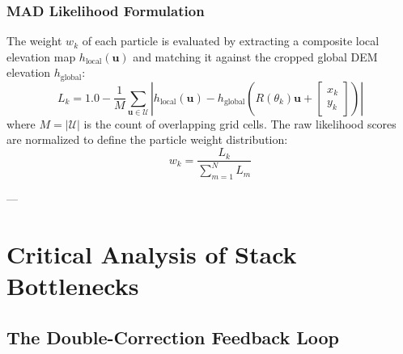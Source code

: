 \documentclass[10pt,journal,compsoc]{IEEEtran}
\begin{document}
\subsubsection{MAD Likelihood Formulation}
The weight $w_k$ of each particle is evaluated by extracting a composite local elevation map $h_{\text{local}}(\mathbf{u})$ and matching it against the cropped global DEM elevation $h_{\text{global}}$:
\begin{equation}
    L_k = 1.0 - \frac{1}{M} \sum_{\mathbf{u} \in \mathcal{U}} \left| h_{\text{local}}(\mathbf{u}) - h_{\text{global}}\left( R(\theta_k)\mathbf{u} + \begin{bmatrix} x_k \\ y_k \end{bmatrix} \right) \right|
\end{equation}
where $M = |\mathcal{U}|$ is the count of overlapping grid cells. The raw likelihood scores are normalized to define the particle weight distribution:
\begin{equation}
    w_k = \frac{L_k}{\sum_{m=1}^N L_m}
\end{equation}

---

\section{Critical Analysis of Stack Bottlenecks}

\subsection{The Double-Correction Feedback Loop}
\end{document}
